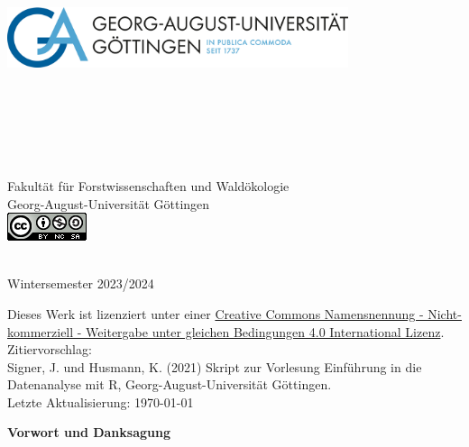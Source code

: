 \begin{titlepage}
\begin{center}
\vfill
\includegraphics[width=10cm,height=8cm]{misc/fig/logo-uni-neu.png}
~\\[0.4cm]

Fakultät für Forstwissenschaften und Waldökologie \\
Georg-August-Universität Göttingen \\[1.2cm]
\includegraphics{misc/fig/logo_cc.png}
\vfill

\hRule ~\\[0.5cm]
{\large Wintersemester 2023/2024}\\


\end{center}
\newpage
\vspace*{\fill}
Dieses Werk ist lizenziert unter einer \href{https://creativecommons.org/licenses/by-nc-sa/4.0/}{Creative Commons Namensnennung - Nicht-kommerziell - Weitergabe unter gleichen Bedingungen 4.0 International Lizenz}. \\[1cm]
Zitiervorschlag: \\
Signer, J. und Husmann, K. (2021) Skript zur Vorlesung Einführung in die Datenanalyse mit R, Georg-August-Universität Göttingen.
~\\[1cm]
Letzte Aktualisierung: \today

\newpage

{\bf Vorwort und Danksagung} \\[0.5cm]


\end{titlepage}
